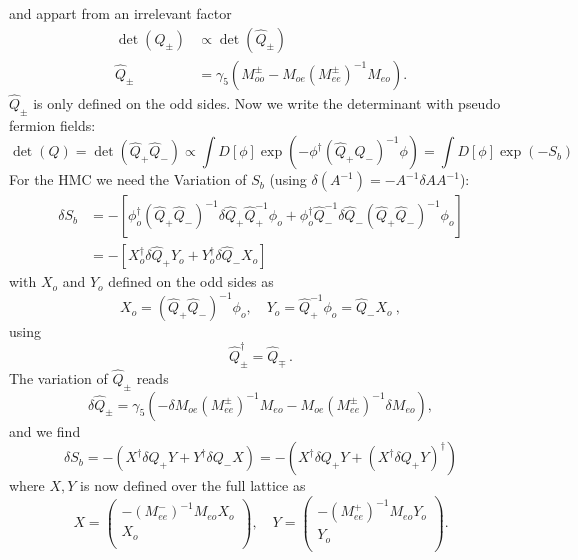 and appart from an irrelevant factor
\begin{equation}
  \label{eq:eo4}
  \begin{split}
    \det(Q_\pm) &\propto \det(\hat Q_\pm) \\
    \hat Q_\pm &= \gamma_5(M_{oo}^\pm - M_{oe}(M_{ee}^\pm )^{-1}M_{eo}). 
  \end{split}
\end{equation}
$\hat Q_\pm$ is only defined on the odd sides. Now we write the
determinant with pseudo fermion fields:
\[
\det(Q) = \det(\hat Q_+ \hat Q_-) \propto \int D[\phi]\exp(-\phi^\dagger (\hat Q_+ \hat Q_-)^{-1} \phi) = \int D[\phi]\exp(-S_b)
\]
For the HMC we need the Variation of $S_b$ (using $\delta (A^{-1})=-A^{-1}\delta A A^{-1}$):
\begin{equation}
  \label{eq:eo5}
  \begin{split}
    \delta S_b &= -[\phi_o^\dagger (\hat Q_+ \hat Q_-)^{-1}\delta \hat Q_+ \hat Q_+^{-1}\phi_o +
    \phi_o^\dagger\hat Q_-^{-1}\delta \hat Q_- (\hat Q_+ \hat Q_-)^{-1} \phi_o ] \\
     &= -[X_o^\dagger \delta \hat Q_+ Y_o + Y_o^\dagger \delta\hat Q_- X_o]
  \end{split}
\end{equation}
with $X_o$ and $Y_o$ defined on the odd sides as 
\begin{equation}
  \label{eq:eo6}
  X_o = (\hat Q_+ \hat Q_-)^{-1} \phi_o,\quad Y_o = \hat Q_+^{-1}\phi_o=\hat
  Q_-X_o\ ,
\end{equation}
using
\[
\hat Q_\pm^\dagger = \hat Q_\mp\, .
\]
The variation of $\hat Q_\pm$ reads
\begin{equation}
  \label{eq:eo7}
  \delta \hat Q_\pm = \gamma_5\left(-\delta M_{oe}(M_{ee}^\pm )^{-1}M_{eo} -
    M_{oe}(M_{ee}^\pm )^{-1}\delta M_{eo}\right),
\end{equation}
and we find
\begin{equation}
  \label{eq:eo8}
  \delta S_b = -(X^\dagger\delta Q_+ Y + Y^\dagger\delta Q_- X) = -(X^\dagger\delta Q_+ Y +(X^\dagger\delta Q_+ Y)^\dagger)
\end{equation}
where $X,Y$ is now defined over the full lattice as
\begin{equation}
  \label{eq:eo9}
  X = 
  \begin{pmatrix}
    -(M_{ee}^-)^{-1}M_{eo}X_o \\ X_o\\
  \end{pmatrix},\quad
  Y = 
  \begin{pmatrix}
    -(M_{ee}^+)^{-1}M_{eo}Y_o \\ Y_o\\
  \end{pmatrix}.
\end{equation}
